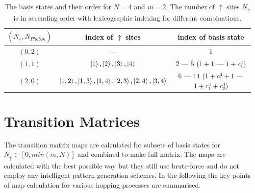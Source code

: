 \documentclass[a4paper,twocolumn]{revtex4-1} %
\newcommand{\da}{\downarrow}
\newcommand{\ua}{\uparrow}
\begin{document}

\begin{table}[h]
\begin{center}
\begin{tabular}{ |c|c|c| } 
 \hline
 $(N_{\ua},N_{Photon})$ & index of $\ua$ sites & index of basis state \\  \hline
$(0,2)$ &---& $1$ \\  \hline
$(1,1)$ &${\ket{1}, \ket{2}, \ket{3}, \ket{4}}$ & $2$ --- $5$ ($1+1$ --- $1+c^4_1$)\\  \hline
$(2,0)$ &${\ket{1, 2}, \ket{1, 3}, \ket{1, 4}, \ket{2, 3}, \ket{2, 4}, \ket{3, 4}}$&  $6$ --- $11$ ($1+c^4_1+1$ --- $1+c^4_1+c^4_2$)\\
  \hline
\end{tabular}
\end{center}
\caption{ The basis states and their order for $N=4$ and $m=2$. 
The number of $\ua$ sites $N_{\ua}$ is in ascending order with 
lexicographic indexing for different combinations.
\label{tab:basis}}
\end{table}









\section{Transition Matrices}
The transition matrix maps are calculated for subsets of basis states
for $N_{\ua}\in [0,min(m,N)]$
and combined to make full matrix.
The maps are calculated with the best possible way but they still use brute-force and 
do not employ any intelligent pattern generation schemes. 
In the following the key points of map calculation for various hopping processes are summarised.
\end{document}
